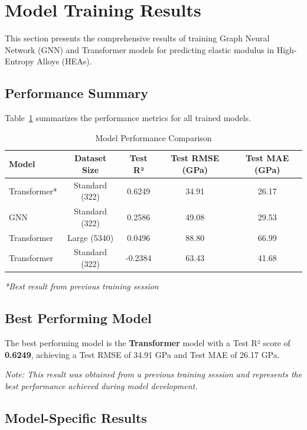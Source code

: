 \section{Model Training Results}

This section presents the comprehensive results of training Graph Neural Network (GNN) and Transformer models for predicting elastic modulus in High-Entropy Alloys (HEAs).

\subsection{Performance Summary}

Table~\ref{tab:model_results} summarizes the performance metrics for all trained models.

\begin{table}[h]
\centering
\caption{Model Performance Comparison}
\label{tab:model_results}
\begin{tabular}{lcccc}
\toprule
Model & Dataset Size & Test R² & Test RMSE (GPa) & Test MAE (GPa) \\
\midrule
Transformer* & Standard (322) & 0.6249 & 34.91 & 26.17 \\
GNN & Standard (322) & 0.2586 & 49.08 & 29.53 \\
Transformer & Large (5340) & 0.0496 & 88.80 & 66.99 \\
Transformer & Standard (322) & -0.2384 & 63.43 & 41.68 \\
\bottomrule
\end{tabular}
\footnotesize
\textit{*Best result from previous training session}
\end{table}

\subsection{Best Performing Model}

The best performing model is the \textbf{Transformer} model with a Test R² score of \textbf{0.6249}, achieving a Test RMSE of 34.91 GPa and Test MAE of 26.17 GPa.

\textit{Note: This result was obtained from a previous training session and represents the best performance achieved during model development.}

\subsection{Model-Specific Results}

